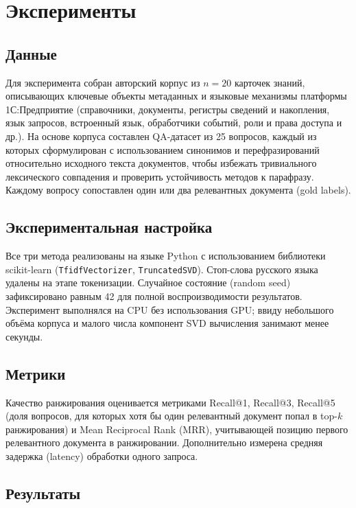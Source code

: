 \documentclass[11pt]{article}
\begin{document}
\section{Эксперименты}

\subsection{Данные}

Для эксперимента собран авторский корпус из $n=20$ карточек знаний,
описывающих ключевые объекты метаданных и языковые механизмы платформы
1С:Предприятие (справочники, документы, регистры сведений и накопления,
язык запросов, встроенный язык, обработчики событий, роли и права доступа
и др.). На основе корпуса составлен QA-датасет из 25 вопросов, каждый из
которых сформулирован с использованием синонимов и перефразирований
относительно исходного текста документов, чтобы избежать тривиального
лексического совпадения и проверить устойчивость методов к парафразу.
Каждому вопросу сопоставлен один или два релевантных документа (gold labels).

\subsection{Экспериментальная настройка}

Все три метода реализованы на языке Python с использованием библиотеки
scikit-learn (\texttt{TfidfVectorizer}, \texttt{TruncatedSVD}). Стоп-слова
русского языка удалены на этапе токенизации. Случайное состояние (random
seed) зафиксировано равным 42 для полной воспроизводимости результатов.
Эксперимент выполнялся на CPU без использования GPU; ввиду небольшого
объёма корпуса и малого числа компонент SVD вычисления занимают менее
секунды.

\subsection{Метрики}

Качество ранжирования оценивается метриками Recall@1, Recall@3, Recall@5
(доля вопросов, для которых хотя бы один релевантный документ попал в
top-$k$ ранжирования) и Mean Reciprocal Rank (MRR), учитывающей позицию
первого релевантного документа в ранжировании. Дополнительно измерена
средняя задержка (latency) обработки одного запроса.

\subsection{Результаты}
\end{document}
